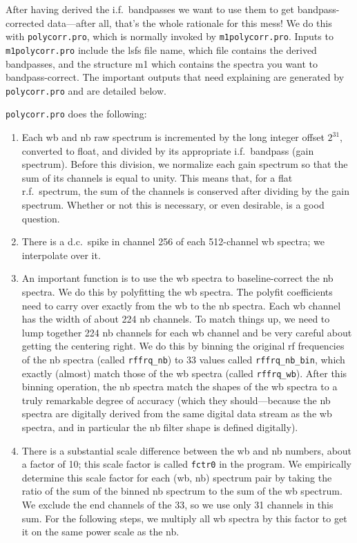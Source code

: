 \documentclass[psfig,preprint]{aastex}
\begin{document}
	After having derived the i.f.\ bandpasses we want to use them to
get bandpass-corrected data---after all, that's the whole rationale for
this mess! We do this with \verb$polycorr.pro$, which is normally
invoked by \verb$m1polycorr.pro$.  Inputs to \verb$m1polycorr.pro$
include the lsfs file name, which file contains the derived bandpasses,
and the structure m1 which contains the spectra you want to
bandpass-correct.  The important outputs that need explaining are
generated by \verb$polycorr.pro$ and are detailed below. 

	\verb$polycorr.pro$ does the following:
\begin{enumerate}

	\item Each wb and nb raw spectrum is incremented by the long
integer offset $2^{31}$, converted to float, and divided by its
appropriate i.f.\ bandpass (gain spectrum).  Before this division, we
normalize each gain spectrum so that the sum of its channels is equal to
unity.  This means that, for a flat r.f.\ spectrum, the sum of the
channels is conserved after dividing by the gain spectrum.  Whether or
not this is necessary, or even desirable, is a good question. 

	\item There is a d.c.\ spike in channel 256 of each 512-channel
wb spectra; we interpolate over it. 

	\item An important function is to use the wb spectra to
baseline-correct the nb spectra.  We do this by polyfitting the wb
spectra.  The polyfit coefficients need to carry over exactly from the
wb to the nb spectra.  Each wb channel has the width of about 224 nb
channels.  To match things up, we need to lump together 224 nb channels
for each wb channel and be very careful about getting the centering
right.  We do this by binning the original rf frequencies of the nb
spectra (called \verb$rffrq_nb$) to 33 values called \verb$rffrq_nb_bin$,
which exactly (almost) match those of the wb spectra (called
\verb$rffrq_wb$).  After this binning operation, the nb spectra match
the shapes of the wb spectra to a truly remarkable degree of accuracy
(which they should---because the nb spectra are digitally derived from
the same digital data stream as the wb spectra, and in particular the nb
filter shape is defined digitally). 

	\item There is a substantial scale difference between the wb and
nb numbers, about a factor of 10; this scale factor is called
\verb$fctr0$ in the program.  We empirically determine this scale
factor for each (wb, nb) spectrum pair by taking the ratio of the sum of
the binned nb spectrum to the sum of the wb spectrum.  We exclude the
end channels of the 33, so we use only 31 channels in this sum.  For the
following steps, we multiply all wb spectra by this factor to get it on
the same power scale as the nb.


\end{enumerate}
\end{document}
